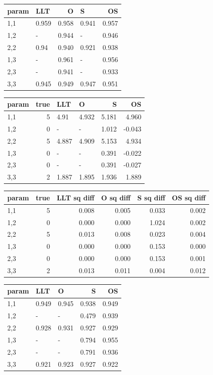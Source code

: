 \documentclass[
]{article}
\begin{document}
\begin{longtable}[t]{l|l|r|l|r}
\hline
param & LLT & O & S & OS\\
\hline
1,1 & 0.959 & 0.958 & 0.941 & 0.957\\
\hline
1,2 & - & 0.944 & - & 0.946\\
\hline
2,2 & 0.94 & 0.940 & 0.921 & 0.938\\
\hline
1,3 & - & 0.961 & - & 0.956\\
\hline
2,3 & - & 0.941 & - & 0.933\\
\hline
3,3 & 0.945 & 0.949 & 0.947 & 0.951\\
\hline
\end{longtable}

\begin{longtable}[t]{l|r|l|l|r|r}
\hline
param & true & LLT & O & S & OS\\
\hline
1,1 & 5 & 4.91 & 4.932 & 5.181 & 4.960\\
\hline
1,2 & 0 & - & - & 1.012 & -0.043\\
\hline
2,2 & 5 & 4.887 & 4.909 & 5.153 & 4.934\\
\hline
1,3 & 0 & - & - & 0.391 & -0.022\\
\hline
2,3 & 0 & - & - & 0.391 & -0.027\\
\hline
3,3 & 2 & 1.887 & 1.895 & 1.936 & 1.889\\
\hline
\end{longtable}

\begin{longtable}[t]{l|r|r|r|r|r}
\hline
param & true & LLT sq diff & O sq diff & S sq diff & OS sq diff\\
\hline
1,1 & 5 & 0.008 & 0.005 & 0.033 & 0.002\\
\hline
1,2 & 0 & 0.000 & 0.000 & 1.024 & 0.002\\
\hline
2,2 & 5 & 0.013 & 0.008 & 0.023 & 0.004\\
\hline
1,3 & 0 & 0.000 & 0.000 & 0.153 & 0.000\\
\hline
2,3 & 0 & 0.000 & 0.000 & 0.153 & 0.001\\
\hline
3,3 & 2 & 0.013 & 0.011 & 0.004 & 0.012\\
\hline
\end{longtable}

\begin{longtable}[t]{l|l|l|r|r}
\hline
param & LLT & O & S & OS\\
\hline
1,1 & 0.949 & 0.945 & 0.938 & 0.949\\
\hline
1,2 & - & - & 0.479 & 0.939\\
\hline
2,2 & 0.928 & 0.931 & 0.927 & 0.929\\
\hline
1,3 & - & - & 0.794 & 0.955\\
\hline
2,3 & - & - & 0.791 & 0.936\\
\hline
3,3 & 0.921 & 0.923 & 0.927 & 0.922\\
\hline
\end{longtable}
\end{document}
